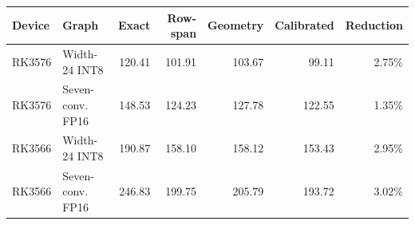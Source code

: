 \begin{tabular}{llrrrrr}
\hline
Device & Graph & Exact & Row-span & Geometry & Calibrated & Reduction \\
\hline
RK3576 & Width-24 INT8 & 120.41 & 101.91 & 103.67 & 99.11 & 2.75\% \\
RK3576 & Seven-conv. FP16 & 148.53 & 124.23 & 127.78 & 122.55 & 1.35\% \\
RK3566 & Width-24 INT8 & 190.87 & 158.10 & 158.12 & 153.43 & 2.95\% \\
RK3566 & Seven-conv. FP16 & 246.83 & 199.75 & 205.79 & 193.72 & 3.02\% \\
\hline
\end{tabular}
